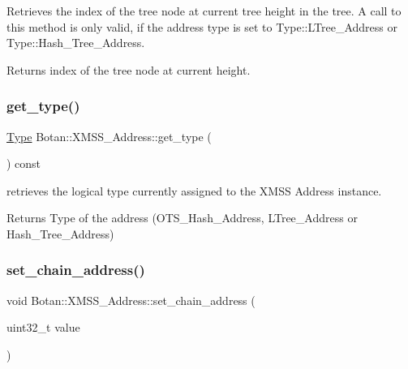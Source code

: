 Retrieves the index of the tree node at current tree height in the tree. A call to this method is only valid, if the address type is set to Type\+::\+L\+Tree\+\_\+\+Address or Type\+::\+Hash\+\_\+\+Tree\+\_\+\+Address.

\begin{DoxyReturn}{Returns}
index of the tree node at current height. 
\end{DoxyReturn}
\mbox{\label{class_botan_1_1_x_m_s_s___address_a278cf3ba854261fd2c73fbc996fb89b1}} 
\subsubsection{\texorpdfstring{get\+\_\+type()}{get\_type()}}
{\footnotesize\ttfamily \hyperlink{class_botan_1_1_x_m_s_s___address_a0101e45c5608cf312b497bf6d855000e}{Type} Botan\+::\+X\+M\+S\+S\+\_\+\+Address\+::get\+\_\+type (\begin{DoxyParamCaption}{ }\end{DoxyParamCaption}) const\hspace{0.3cm}{\ttfamily [inline]}}

retrieves the logical type currently assigned to the X\+M\+SS Address instance.

\begin{DoxyReturn}{Returns}
Type of the address (O\+T\+S\+\_\+\+Hash\+\_\+\+Address, L\+Tree\+\_\+\+Address or Hash\+\_\+\+Tree\+\_\+\+Address) 
\end{DoxyReturn}
\mbox{\label{class_botan_1_1_x_m_s_s___address_a766e70130914b681020366d80c625fce}} 
\subsubsection{\texorpdfstring{set\+\_\+chain\+\_\+address()}{set\_chain\_address()}}
{\footnotesize\ttfamily void Botan\+::\+X\+M\+S\+S\+\_\+\+Address\+::set\+\_\+chain\+\_\+address (\begin{DoxyParamCaption}\item[{uint32\+\_\+t}]{value }\end{DoxyParamCaption})\hspace{0.3cm}{\ttfamily [inline]}}

